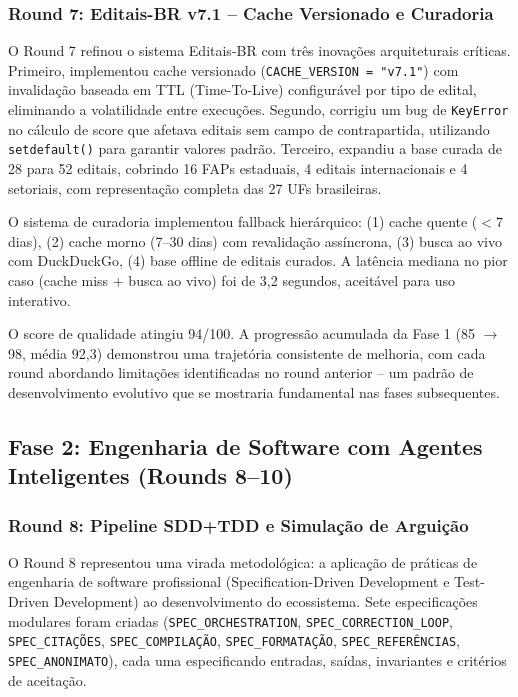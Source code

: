 \subsubsection{Round 7: Editais-BR v7.1 -- Cache Versionado e Curadoria}

O Round 7 refinou o sistema Editais-BR com três inovações arquiteturais
críticas. Primeiro, implementou cache versionado (\texttt{CACHE\_VERSION =
"v7.1"}) com invalidação baseada em TTL (Time-To-Live) configurável por
tipo de edital, eliminando a volatilidade entre execuções. Segundo,
corrigiu um bug de \texttt{KeyError} no cálculo de score que afetava
editais sem campo de contrapartida, utilizando \texttt{setdefault()} para
garantir valores padrão. Terceiro, expandiu a base curada de 28 para 52
editais, cobrindo 16 FAPs estaduais, 4 editais internacionais e 4
setoriais, com representação completa das 27 UFs brasileiras.

O sistema de curadoria implementou fallback hierárquico: (1) cache quente
($< 7$ dias), (2) cache morno (7--30 dias) com revalidação assíncrona,
(3) busca ao vivo com DuckDuckGo, (4) base offline de editais curados. A
latência mediana no pior caso (cache miss + busca ao vivo) foi de 3,2
segundos, aceitável para uso interativo.

O score de qualidade atingiu 94/100. A progressão acumulada da Fase 1
(85 $\rightarrow$ 98, média 92,3) demonstrou uma trajetória consistente de
melhoria, com cada round abordando limitações identificadas no round
anterior -- um padrão de desenvolvimento evolutivo que se mostraria
fundamental nas fases subsequentes.

\subsection{Fase 2: Engenharia de Software com Agentes Inteligentes (Rounds 8--10)}

\subsubsection{Round 8: Pipeline SDD+TDD e Simulação de Arguição}

O Round 8 representou uma virada metodológica: a aplicação de práticas de
engenharia de software profissional (Specification-Driven Development e
Test-Driven Development) ao desenvolvimento do ecossistema. Sete
especificações modulares foram criadas (\texttt{SPEC\_ORCHESTRATION},
\texttt{SPEC\_CORRECTION\_LOOP}, \texttt{SPEC\_CITAÇÕES},
\texttt{SPEC\_COMPILAÇÃO}, \texttt{SPEC\_FORMATAÇÃO},
\texttt{SPEC\_REFERÊNCIAS}, \texttt{SPEC\_ANONIMATO}), cada uma
especificando entradas, saídas, invariantes e critérios de aceitação.

